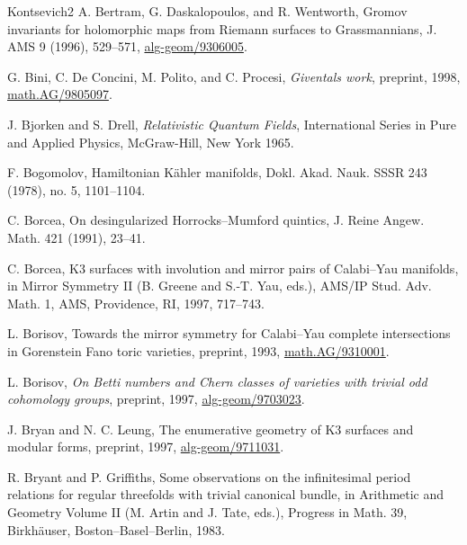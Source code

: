 \begin{thebibliography}{Kontsevich2}
\hypertarget{bib:BDW}{}
A. Bertram, G. Daskalopoulos, and R. Wentworth, Gromov invariants for holomorphic maps from Riemann surfaces to Grassmannians, J. AMS 9 (1996), 529--571, \href{https://arxiv.org/abs/alg-geom/9306005}{alg-geom/9306005}.

\hypertarget{bib:BDPP}{}
G. Bini, C. De Concini, M. Polito, and C. Procesi, \emph{Givental\textquotesingle s work}, preprint, 1998, \href{https://arxiv.org/abs/math/9805097}{math.AG/9805097}.

\hypertarget{bib:BjoD}{} J. Bjorken and S. Drell, \emph{Relativistic Quantum Fields}, International Series in Pure and Applied Physics, McGraw-Hill, New York 1965.


\hypertarget{bib:Bogomolov}{}
F. Bogomolov, Hamiltonian Kähler manifolds, Dokl. Akad. Nauk. SSSR 243 (1978),
no. 5, 1101--1104.

\hypertarget{bib:Borcea1}{}
C. Borcea, On desingularized Horrocks--Mumford quintics, J. Reine Angew. Math. 421 (1991), 23--41.

\hypertarget{bib:Borcea2}{}
C. Borcea, K3 surfaces with involution and mirror pairs of Calabi--Yau manifolds,
in Mirror Symmetry II (B. Greene and S.-T. Yau, eds.), AMS/IP Stud. Adv. Math. 1,
AMS, Providence, RI, 1997, 717--743.

\hypertarget{bib:Borisov1}{}
L. Borisov, Towards the mirror symmetry for Calabi--Yau complete intersections
in Gorenstein Fano toric varieties, preprint, 1993, \href{https://arxiv.org/abs/alg-geom/9310001}{math.AG/9310001}.

\hypertarget{bib:Borisov2}{}
L. Borisov, \emph{On Betti numbers and Chern classes of varieties with trivial odd cohomology groups}, preprint, 1997, \href{https://arxiv.org/abs/alg-geom/9703023}{alg-geom/9703023}.

\hypertarget{bib:BL}{}
J. Bryan and N. C. Leung, The enumerative geometry of K3 surfaces and modular forms, preprint, 1997, \href{https://arxiv.org/abs/alg-geom/9711031}{alg-geom/9711031}.

\hypertarget{bib:BG}{}
R. Bryant and P. Griffiths, Some observations on the infinitesimal period relations
for regular threefolds with trivial canonical bundle, in Arithmetic and Geometry
Volume II (M. Artin and J. Tate, eds.), Progress in Math. 39, Birkhäuser,
Boston--Basel--Berlin, 1983.


\end{thebibliography}
